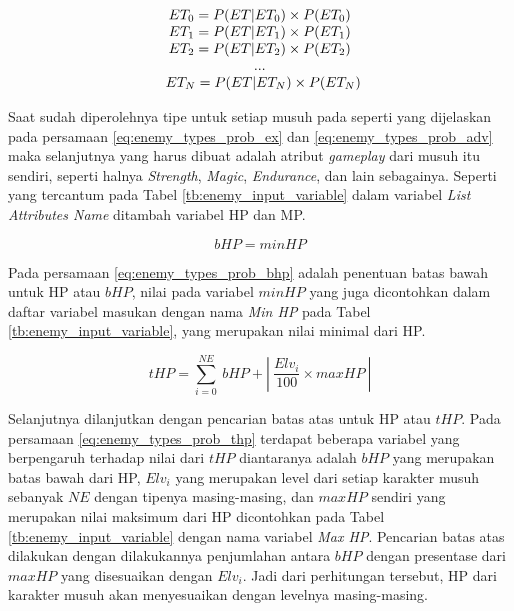 \begin{equation}\label{eq:enemy_types_prob_adv}
\resizebox{0.42\textwidth}{!}{%
	$\begin{matrix}
	ET_{0} = P(ET | ET_{0}) \times P(ET_{0})\\
	ET_{1} = P(ET | ET_{1}) \times P(ET_{1})\\
	ET_{2} = P(ET | ET_{2}) \times P(ET_{2})\\
	...\\
	\hspace{0.5em} ET_{N} = P(ET | ET_{N}) \times P(ET_{N})
	\end{matrix}$%
}
\end{equation}

Saat sudah diperolehnya tipe untuk setiap musuh pada seperti yang dijelaskan pada persamaan \ref{eq:enemy_types_prob_ex} dan \ref{eq:enemy_types_prob_adv} maka selanjutnya yang harus dibuat adalah atribut \textit{gameplay} dari musuh itu sendiri, seperti halnya \textit{Strength}, \textit{Magic}, \textit{Endurance}, dan lain sebagainya. Seperti yang tercantum pada Tabel \ref{tb:enemy_input_variable} dalam variabel \textit{List Attributes Name} ditambah variabel HP dan MP.
\vspace{1ex}

\begin{equation}\label{eq:enemy_types_prob_bhp}
bHP = minHP
\end{equation}

Pada persamaan \ref{eq:enemy_types_prob_bhp} adalah penentuan batas bawah untuk HP atau $bHP$, nilai pada variabel $minHP$ yang juga dicontohkan dalam daftar variabel masukan dengan nama \textit{Min HP} pada Tabel \ref{tb:enemy_input_variable}, yang merupakan nilai minimal dari HP.
\vspace{1ex}

\begin{equation}\label{eq:enemy_types_prob_thp}
tHP = \sum_{i=0}^{NE}\ bHP + \left |\ \frac{Elv_{i}}{100} \times maxHP\ \right |
\end{equation}

Selanjutnya dilanjutkan dengan pencarian batas atas untuk HP atau $tHP$. Pada persamaan \ref{eq:enemy_types_prob_thp} terdapat beberapa variabel yang berpengaruh terhadap nilai dari $tHP$ diantaranya adalah $bHP$ yang merupakan batas bawah dari HP, $Elv_{i}$ yang merupakan level dari setiap karakter musuh sebanyak $NE$ dengan tipenya masing-masing, dan $maxHP$ sendiri yang merupakan nilai maksimum dari HP dicontohkan pada Tabel \ref{tb:enemy_input_variable} dengan nama variabel \textit{Max HP}. Pencarian batas atas dilakukan dengan dilakukannya penjumlahan antara $bHP$ dengan presentase dari $maxHP$ yang disesuaikan dengan $Elv_{i}$. Jadi dari perhitungan tersebut, HP dari karakter musuh akan menyesuaikan dengan levelnya masing-masing. 
\vspace{1ex}

